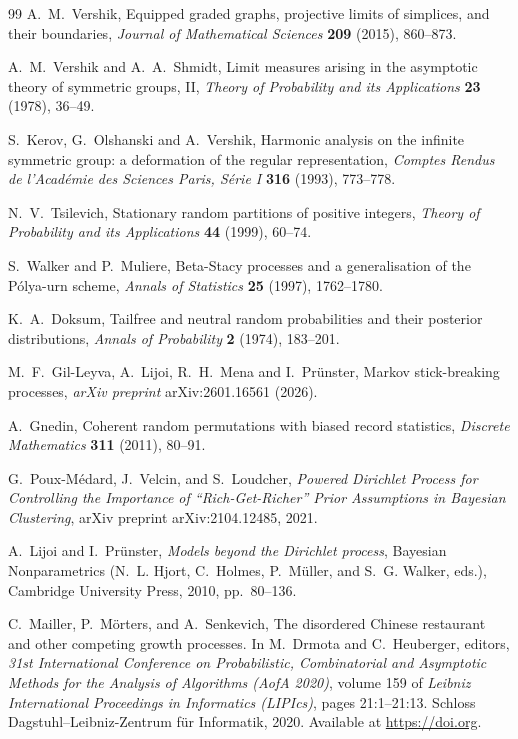 \documentclass[11pt]{article}
\theoremstyle{plain}
\theoremstyle{definition}
\begin{document}
\begin{thebibliography}{99}
 A.~M.~Vershik, Equipped graded graphs, projective limits of simplices, and their boundaries, \emph{Journal of Mathematical Sciences} \textbf{209} (2015), 860--873.

 A.~M.~Vershik and A.~A.~Shmidt, Limit measures arising in the asymptotic theory of symmetric groups, II, \emph{Theory of Probability and its Applications} \textbf{23} (1978), 36--49.

 S.~Kerov, G.~Olshanski and A.~Vershik, Harmonic analysis on the infinite symmetric group: a deformation of the regular representation, \emph{Comptes Rendus de l'Acad\'emie des Sciences Paris, S\'erie I} \textbf{316} (1993), 773--778.

 N.~V.~Tsilevich, Stationary random partitions of positive integers, \emph{Theory of Probability and its Applications} \textbf{44} (1999), 60--74.

 S.~Walker and P.~Muliere, Beta-Stacy processes and a generalisation of the P\'olya-urn scheme, \emph{Annals of Statistics} \textbf{25} (1997), 1762--1780.

 K.~A.~Doksum, Tailfree and neutral random probabilities and their posterior distributions, \emph{Annals of Probability} \textbf{2} (1974), 183--201.

 M.~F.~Gil-Leyva, A.~Lijoi, R.~H.~Mena and I.~Pr\"unster, Markov stick-breaking processes, \emph{arXiv preprint} arXiv:2601.16561 (2026).

 A.~Gnedin, Coherent random permutations with biased record statistics, \emph{Discrete Mathematics} \textbf{311} (2011), 80--91.


G.~Poux-M{\'e}dard, J.~Velcin, and S.~Loudcher, 
\emph{Powered Dirichlet Process for Controlling the Importance of ``Rich-Get-Richer'' Prior Assumptions in Bayesian Clustering}, 
arXiv preprint arXiv:2104.12485, 2021.


A.~Lijoi and I.~Pr{\"u}nster,
\emph{Models beyond the Dirichlet process},
Bayesian Nonparametrics (N.~L. Hjort, C.~Holmes, P.~M{\"u}ller, and S.~G. Walker, eds.), 
Cambridge University Press, 2010, pp.~80--136.

 C.~Mailler, P.~Mörters, and A.~Senkevich,
 The disordered {C}hinese restaurant and other competing growth processes.
 In M.~Drmota and C.~Heuberger, editors, {\em 31st International Conference on Probabilistic, Combinatorial and Asymptotic Methods for the Analysis of Algorithms (AofA 2020)}, volume 159 of {\em Leibniz International Proceedings in Informatics (LIPIcs)}, pages 21:1--21:13. Schloss Dagstuhl--Leibniz-Zentrum für Informatik, 2020.
 Available at \url{https://doi.org}.


\end{thebibliography}
\end{document}
